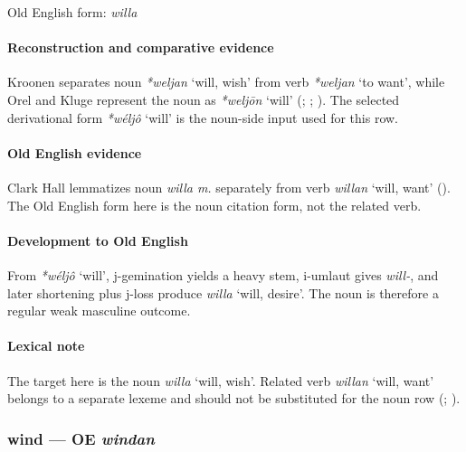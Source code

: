 \documentclass[
  british,
  a4paper,
]{article}
\providecommand{\Recon}[1]{\emph{*#1}}
\begin{document}
Old English form: \emph{willa}

\paragraph{Reconstruction and comparative
evidence}\label{reconstruction-and-comparative-evidence-70}

Kroonen separates noun \Recon{weljan} `will, wish' from verb
\Recon{weljan} `to want', while Orel and Kluge represent the noun as
\Recon{weljōn} `will' (;
;
). The selected derivational
form \Recon{wéljô} `will' is the noun-side input used for this row.

\paragraph{Old English evidence}\label{old-english-evidence-70}

Clark Hall lemmatizes noun \emph{willa m.} separately from verb
{\emph{willan}} `will, want' (). The Old English form here is the noun citation form, not
the related verb.

\paragraph{Development to Old
English}\label{development-to-old-english-70}

From \Recon{wéljô} `will', j-gemination yields a heavy stem, i-umlaut
gives \emph{will-}, and later shortening plus j-loss produce
{\emph{willa}} `will, desire'. The noun is therefore a regular weak
masculine outcome.

\paragraph{Lexical note}\label{lexical-note-4}

The target here is the noun \emph{willa} `will, wish'. Related verb
{\emph{willan}} `will, want' belongs to a separate lexeme and should not
be substituted for the noun row (; ).

\subsubsection{\texorpdfstring{wind --- OE
\emph{windan}}{wind --- OE windan}}\label{wind-oe-windan}
\end{document}
